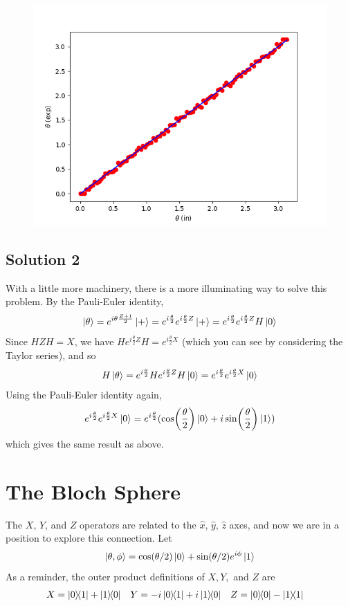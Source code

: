 \documentclass{article}
\begin{document}
{\begin{centering}
\begin{figure}[hbt!]
        \includegraphics[width = .6\textwidth]{RamseyFringe.png}
        \label{fig:enter-label}
    \end{figure}
\end{centering}
\subsection*{Solution 2}
With a little more machinery, there is a more illuminating way to solve this problem. By the Pauli-Euler identity,
$$
\ket{\theta} = e^{i\theta \frac{Z+1}{2}}\ket{+} = e^{i\frac{\theta}{2}}e^{i\frac{\theta}{2}Z}\ket{+} = e^{i\frac{\theta}{2}}e^{i\frac{\theta}{2}Z}H\ket{0}
$$
Since $HZH = X$, we have $He^{i\frac{\theta}{2} Z}H = e^{i\frac{\theta}{2} X}$ (which you can see by considering the Taylor series), and so
$$
H\ket{\theta} = e^{i\frac{\theta}{2}}He^{i\frac{\theta}{2} Z}H\ket{0} =  e^{i\frac{\theta}{2}}e^{i\frac{\theta}{2} X}\ket{0}
$$
Using the Pauli-Euler identity again,
$$
 e^{i\frac{\theta}{2}}e^{i\frac{\theta}{2} X}\ket{0} =  e^{i\frac{\theta}{2}}(\cos(\frac{\theta}{2})\ket{0} + i\sin(\frac{\theta}{2})\ket{1})
$$
which gives the same result as above.
\section*{The Bloch Sphere}
The $X$, $Y$, and $Z$ operators are related to the $\hat x$, $\hat y$, $\hat z$ axes, and now we are in a position to explore this connection. Let
$$
\ket{\theta, \phi} = \cos(\theta/2)\ket{0} + \sin(\theta/2)e^{i\phi}\ket{1}
$$
As a reminder, the outer product definitions of $X,Y,$ and $Z$ are
\begin{align*}
X &= \ketbra{0}{1} + \ketbra{1}{0} & Y &= -i\ketbra{0}{1} + i\ketbra{1}{0} & Z &= \ketbra{0}{0} - \ketbra{1}{1}
\end{align*}
}
\end{document}
